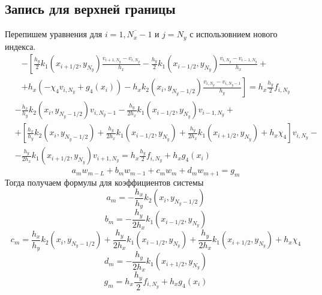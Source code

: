 \subsection{Запись для верхней границы}
Перепишем уравнения для $i = \overline{1,N_x-1}$ и $j = N_y$ с использовнием нового индекса.
\begin{multline*}
    - \left[
    \frac{h_y}{2} k_1(x_{i+1/2},y_{N_y}) \frac{v_{i+1,N_y} - v_{i,N_y}}{h_x} - \frac{h_y}{2} k_1(x_{i-1/2},y_{N_y}) \frac{v_{i,N_y} - v_{i-1,N_y}}{h_x} + \right. \\
    \left. +
    h_x \left( - \chi_4 v_{i,N_y} + g_4(x_i) \right) - h_x k_2(x_i,y_{N_y-1/2}) \frac{v_{i,N_y} - v_{i,N_y-1}}{h_y}
    \right] =
    h_x \frac{h_y}{2} f_{i,N_y}
\end{multline*}
\[
\begin{split}
    &-\frac{h_x}{h_y} k_2(x_i,y_{N_y-1/2}) v_{i,N_y-1} - \frac{h_y}{2 h_x} k_1(x_{i-1/2},y_{N_y}) v_{i-1,N_y} +\\
    &+\left[ \frac{h_x}{h_y} k_2(x_i,y_{N_y-1/2}) + \frac{h_y}{2 h_x} k_1(x_{i-1/2},y_{N_y}) + \frac{h_y}{2 h_x} k_1(x_{i+1/2},y_{N_y}) + h_x \chi_4 \right] v_{i,N_y} - \\
    &-\frac{h_y}{2 h_x} k_1(x_{i+1/2},y_{N_y}) v_{i+1,N_y} = h_x \frac{h_y}{2} f_{i,N_y} + h_x g_4(x_i)
\end{split}
\]
\[ a_m w_{m - L} + b_m w_{m - 1} + c_m w_m + d_m w_{m + 1} = g_m \]
Тогда получаем формулы для коэффициентов системы
\[ a_m = -\frac{h_x}{h_y} k_2(x_i,y_{N_y-1/2}) \]
\[ b_m = -\frac{h_y}{2 h_x} k_1(x_{i-1/2},y_{N_y}) \]
\[ c_m = \frac{h_x}{h_y} k_2(x_i,y_{N_y-1/2}) + \frac{h_y}{2 h_x} k_1(x_{i-1/2},y_{N_y}) + \frac{h_y}{2 h_x} k_1(x_{i+1/2},y_{N_y}) + h_x \chi_4 \]
\[ d_m = -\frac{h_y}{2 h_x} k_1(x_{i+1/2},y_{N_y}) \]
\[ g_m = h_x \frac{h_y}{2} f_{i,N_y} + h_x g_4(x_i) \]

